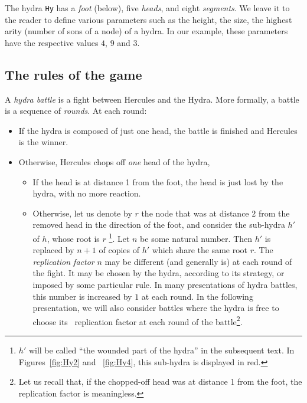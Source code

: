 The hydra \texttt{Hy} has a \emph{foot} (below), five \emph{heads}, and eight \emph{segments}. 
We leave it to the reader to define various parameters such as the height, the size, the highest arity (number of sons of a node) of a hydra. In our example, these parameters have the respective values $4$, $9$ and $3$.




\subsection{The rules of the game}

\label{sec:orgheadline44}
\label{sect:replication-def}

A \emph{hydra battle} is a fight between Hercules and the Hydra. 
More formally, a  battle is a sequence of \emph{rounds}.
At each round:
\begin{itemize}
\item If the hydra is composed of just one head, the battle is finished
and  Hercules is the winner.
\item Otherwise, Hercules chops off \emph{one} head of the hydra,

\begin{itemize}
\item If the head is at distance 1 from the foot, the head is just lost by the hydra, with no more reaction.
\item Otherwise, let us denote by \(r\) the node that was at distance \(2\) from 
the removed head in the direction of the foot,  and consider the  sub-hydra \(h'\) of \(h\), whose  root is \(r\) \footnote{$h'$ will be called ``the wounded part of the hydra'' in the subsequent text. In Figures~\vref{fig:Hy2} and ~\vref{fig:Hy4}, this sub-hydra  is displayed in red.}. Let $n$ be some natural number.
Then $h'$ is replaced by  $n+1$ of copies of \(h'\) which share the same root $r$.
 The \emph{replication factor} $n$ may be different (and generally is)   at each round of the fight.
It may be chosen by the hydra, according to its strategy, or imposed by some 
particular rule. In many presentations of hydra battles, this number is increased by $1$ at each round. In the following presentation, we will also consider battles where the hydra is free to choose its ~replication factor at each round of the battle\footnote{Let us recall that, if the chopped-off head was at distance 1 from the foot, the replication factor is meaningless.}.
\end{itemize}
\end{itemize}



